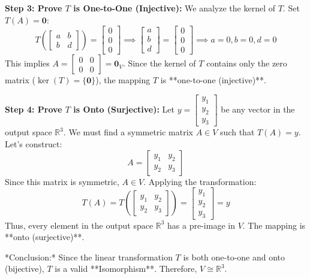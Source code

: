 \documentclass[11pt,a4paper]{article}
\begin{document}
\begin{solutionbox}
\textbf{Step 3: Prove $T$ is One-to-One (Injective):}
We analyze the kernel of $T$. Set $T(A) = \mathbf{0}$:
\[ T\left( \begin{bmatrix} a & b \\ b & d \end{bmatrix} \right) = \begin{bmatrix} 0 \\ 0 \\ 0 \end{bmatrix} \implies \begin{bmatrix} a \\ b \\ d \end{bmatrix} = \begin{bmatrix} 0 \\ 0 \\ 0 \end{bmatrix} \implies a=0, b=0, d=0 \]
This implies $A = \begin{bmatrix} 0 & 0 \\ 0 & 0 \end{bmatrix} = \mathbf{0}_V$.
Since the kernel of $T$ contains only the zero matrix ($\ker(T) = \{\mathbf{0}\}$), the mapping $T$ is **one-to-one (injective)**.

\textbf{Step 4: Prove $T$ is Onto (Surjective):}
Let $y = \begin{bmatrix} y_1 \\ y_2 \\ y_3 \end{bmatrix}$ be any vector in the output space $\mathbb{R}^3$.
We must find a symmetric matrix $A \in V$ such that $T(A) = y$.
Let's construct:
\[ A = \begin{bmatrix} y_1 & y_2 \\ y_2 & y_3 \end{bmatrix} \]
Since this matrix is symmetric, $A \in V$. Applying the transformation:
\[ T(A) = T\left( \begin{bmatrix} y_1 & y_2 \\ y_2 & y_3 \end{bmatrix} \right) = \begin{bmatrix} y_1 \\ y_2 \\ y_3 \end{bmatrix} = y \]
Thus, every element in the output space $\mathbb{R}^3$ has a pre-image in $V$. The mapping is **onto (surjective)**.

*Conclusion:* Since the linear transformation $T$ is both one-to-one and onto (bijective), $T$ is a valid **Isomorphism**. Therefore, $V \cong \mathbb{R}^3$.
\end{solutionbox}
\end{document}

